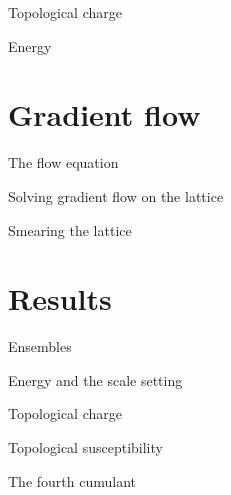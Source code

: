 \documentclass[10pt,show notes on second screen]{beamer}
\begin{document}
\begin{frame}{Topological charge}
\end{frame}

\begin{frame}{Energy}
\end{frame}

\section{Gradient flow}

\begin{frame}{The flow equation}
\end{frame}

\begin{frame}{Solving gradient flow on the lattice}
\end{frame}

\begin{frame}{Smearing the lattice}
\end{frame}

\section{Results}

\begin{frame}{Ensembles}
\end{frame}

\begin{frame}{Energy and the scale setting}
\end{frame}

\begin{frame}{Topological charge}
\end{frame}

\begin{frame}{Topological susceptibility}
\end{frame}

\begin{frame}{The fourth cumulant}
\end{frame}
\end{document}
